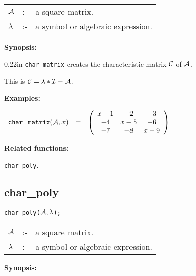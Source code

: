 \hspace*{0.1in}
\begin{tabular}{l l l}
${\cal A}$ &:-& a square matrix. \\
$\lambda$  &:-& a symbol or algebraic expression.
\end{tabular}

{\bf Synopsis:} %

\begin{addtolength}{\leftskip}{0.22in}
{\tt char\_matrix} creates the characteristic matrix ${\cal C}$ of
${\cal A}$.

This is ${\cal C} = \lambda * {\cal I} - {\cal A}$.

\end{addtolength}

{\bf Examples:}

\begin{flushleft}
\hspace*{0.1in}
\begin{math}
\begin{array}{ccc}
{\tt char\_matrix}({\cal A},x) & = &
\left( \begin{array}{ccc} x-1 & -2 & -3 \\ -4 & x-5 & -6 \\ -7 & -8 &
x-9
\end{array} \right)
\end{array}
\end{math}
\end{flushleft}

{\bf Related functions:}

\hspace*{0.175in} {\tt char\_poly}.


\subsection{char\_poly}


\hspace*{0.175in} {\tt char\_poly(${\cal A},\lambda$);}

\hspace*{0.1in}
\begin{tabular}{l l l}
${\cal A}$ &:-& a square matrix. \\
$\lambda$ &:-& a symbol or algebraic expression.
\end{tabular}

{\bf Synopsis:} %

